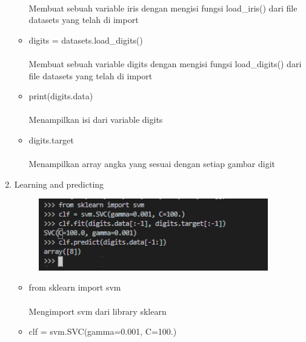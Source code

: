 \documentclass{article}
\begin{document}
\begin{enumerate}
\begin{itemize}
                        \paragraph{} Membuat sebuah variable iris dengan mengisi fungsi load\_iris() dari file datasets yang telah di import
                    \item digits = datasets.load\_digits()
                        \paragraph{}Membuat sebuah variable digits dengan mengisi fungsi load\_digits() dari file datasets yang telah di import
                    \item print(digits.data)
                        \paragraph{}Menampilkan isi dari variable digits
                    \item digits.target
                        \paragraph{}Menampilkan array angka yang sesuai dengan setiap gambar digit 
                \end{itemize}
                \newpage
            \item Learning and predicting
                \begin{figure}[ht]
                    \centerline{\includegraphics[width=10cm]{3.PNG}}
                \end{figure}
                \begin{itemize}
                    \item from sklearn import svm
                        \paragraph{}Mengimport svm dari library sklearn
                    \item clf = svm.SVC(gamma=0.001, C=100.)

\end{itemize}
\end{enumerate}
\end{document}
